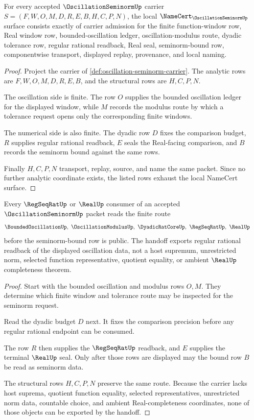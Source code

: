 \begin{theorem}
\label{thm:oscillation-seminorm-namecert-obligations}
For every accepted $\OscillationSeminormUp$ carrier $S=(F,W,O,M,D,R,E,B,H,C,P,N)$, the local $\NameCert_{\OscillationSeminormUp}$ surface consists exactly of carrier admission for the finite function-window row, Real window row, bounded-oscillation ledger, oscillation-modulus route, dyadic tolerance row, regular rational readback, Real seal, seminorm-bound row, componentwise transport, displayed replay, provenance, and local naming.
\end{theorem}
\begin{proof}
Project the carrier of \autoref{def:oscillation-seminorm-carrier}. The analytic rows are $F,W,O,M,D,R,E,B$, and the structural rows are $H,C,P,N$.

The oscillation side is finite. The row $O$ supplies the bounded oscillation ledger for the displayed window, while $M$ records the modulus route by which a tolerance request opens only the corresponding finite windows.

The numerical side is also finite. The dyadic row $D$ fixes the comparison budget, $R$ supplies regular rational readback, $E$ seals the Real-facing comparison, and $B$ records the seminorm bound against the same rows.

Finally $H,C,P,N$ transport, replay, source, and name the same packet. Since no further analytic coordinate exists, the listed rows exhaust the local NameCert surface.
\end{proof}

\begin{theorem}
\label{thm:oscillation-seminorm-regseqrat-handoff}
Every $\RegSeqRatUp$ or $\RealUp$ consumer of an accepted $\OscillationSeminormUp$ packet reads the finite route
$$
\BoundedOscillationUp,\ \OscillationModulusUp,\ \DyadicRatCoreUp,\ \RegSeqRatUp,\ \RealUp
$$
before the seminorm-bound row is public. The handoff exports regular rational readback of the displayed oscillation data, not a host supremum, unrestricted norm, selected function representative, quotient equality, or ambient $\RealUp$ completeness theorem.
\end{theorem}
\begin{proof}
Start with the bounded oscillation and modulus rows $O,M$. They determine which finite window and tolerance route may be inspected for the seminorm request.

Read the dyadic budget $D$ next. It fixes the comparison precision before any regular rational endpoint can be consumed.

The row $R$ then supplies the $\RegSeqRatUp$ readback, and $E$ supplies the terminal $\RealUp$ seal. Only after those rows are displayed may the bound row $B$ be read as seminorm data.

The structural rows $H,C,P,N$ preserve the same route. Because the carrier lacks host suprema, quotient function equality, selected representatives, unrestricted norm data, countable choice, and ambient Real-completeness coordinates, none of those objects can be exported by the handoff.
\end{proof}

